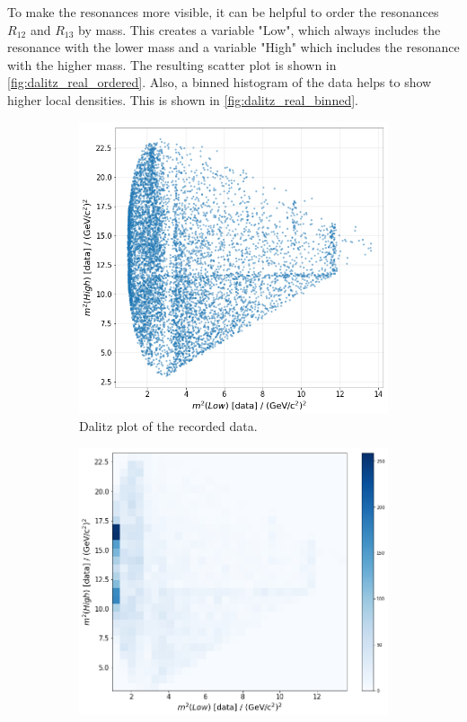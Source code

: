 To make the resonances more visible, it can be helpful to order the resonances $R_{12}$ and $R_{13}$ by mass. This creates a variable "Low", which always includes the resonance with the lower mass and a variable "High" which includes the resonance
with the higher mass. The resulting scatter plot is shown in \autoref{fig:dalitz_real_ordered}. Also, a binned histogram of the data helps to show higher local densities. This is shown in \autoref{fig:dalitz_real_binned}.
\begin{figure}
  \centering
  \begin{subfigure}[b]{0.45\textwidth}
      \centering
      \includegraphics[width=\textwidth]{"content/pics/dalitz_real_ordered.png"}
      \caption{Dalitz plot of the recorded data.}
      \label{fig:dalitz_real_ordered}
  \end{subfigure}
  \hfill
  \begin{subfigure}[b]{0.45\textwidth}
      \centering
      \includegraphics[width=\textwidth]{"content/pics/dalitz_real_ordered_binned.png"}

\end{subfigure}
\end{figure}
